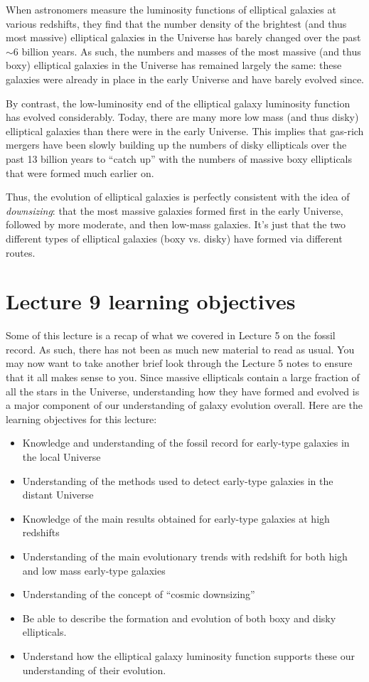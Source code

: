 \documentclass[11pt]{article}
\begin{document}
When astronomers measure the luminosity functions of elliptical
galaxies at various redshifts, they find that the number density of
the brightest (and thus most massive) elliptical galaxies in the
Universe has barely changed over the past $\sim6$ billion years. As
such, the numbers and masses of the most massive (and thus boxy)
elliptical galaxies in the Universe has remained largely the same:
these galaxies were already in place in the early Universe and have
barely evolved since.

By contrast, the low-luminosity end of the elliptical galaxy
luminosity function has evolved considerably. Today, there are many
more low mass (and thus disky) elliptical galaxies than there
were in the early Universe. This implies that gas-rich mergers have
been slowly building up the numbers of disky ellipticals over the past
13 billion years to ``catch up'' with the numbers of massive boxy
ellipticals that were formed much earlier on.

Thus, the evolution of elliptical galaxies is perfectly consistent
with the idea of {\it downsizing}: that the most massive galaxies
formed first in the early Universe, followed by more moderate, and
then low-mass galaxies. It's just that the two different types of
elliptical galaxies (boxy vs. disky) have formed via different routes.

\section{Lecture 9 learning objectives}
Some of this lecture is a recap of what we covered in Lecture 5 on the
fossil record. As such, there has not been as much new material to
read as usual. You may now want to take another brief look through the
Lecture 5 notes to ensure that it all makes sense to you. Since
massive ellipticals contain a large fraction of all the stars in the
Universe, understanding how they have formed and evolved is a major
component of our understanding of galaxy evolution overall. Here are
the learning objectives for this lecture:

\begin{itemize}
\item Knowledge and understanding of the fossil record for early-type galaxies in the local Universe
\item Understanding of the methods used to detect early-type galaxies in the distant Universe
\item Knowledge of the main results obtained for early-type galaxies at high redshifts
\item Understanding of the main evolutionary trends with redshift for both high and low mass early-type galaxies
\item Understanding of the concept of “cosmic downsizing”
\item Be able to describe the formation and evolution of both boxy and
  disky ellipticals.
\item Understand how the elliptical galaxy luminosity function supports
  these our understanding of their evolution.
\end{itemize}
\end{document}
